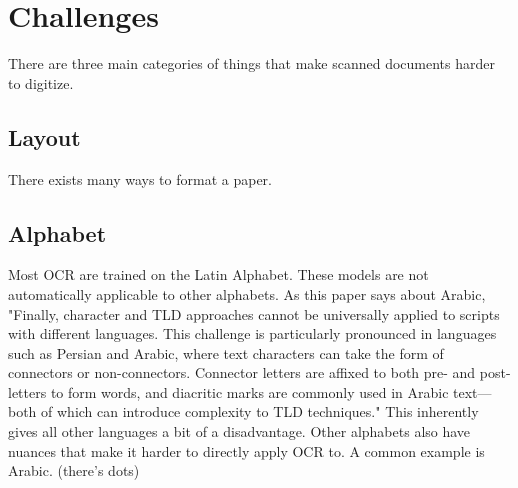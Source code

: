 \documentclass[sigplan,screen,nonacm]{acmart-tagged}
\begin{document}
\section{Challenges}
\label{sec:body}

There are three main categories of things that make scanned documents harder to digitize. 

\subsection{Layout}
\label{sec:Layout}

There exists many ways to format a paper. 



\subsection{Alphabet}
\label{sec:Alphabet}


Most OCR are trained on the Latin Alphabet. These models are not automatically applicable to other alphabets. As this paper\cite{Fateh:2024} says about Arabic, "Finally, character and TLD approaches cannot be universally applied to scripts with different languages. This challenge is particularly pronounced in languages such as Persian and Arabic, where text characters can take the form of connectors or non-connectors. Connector letters are affixed to both pre- and post-letters to form words, and diacritic marks are commonly used in Arabic text—both of which can introduce complexity to TLD techniques." This inherently gives all other languages a bit of a disadvantage. Other alphabets also have nuances that make it harder to directly apply OCR to. A common example is Arabic. (there's dots) \cite{Fateh:2024, Hegghamer:2022}
\end{document}
